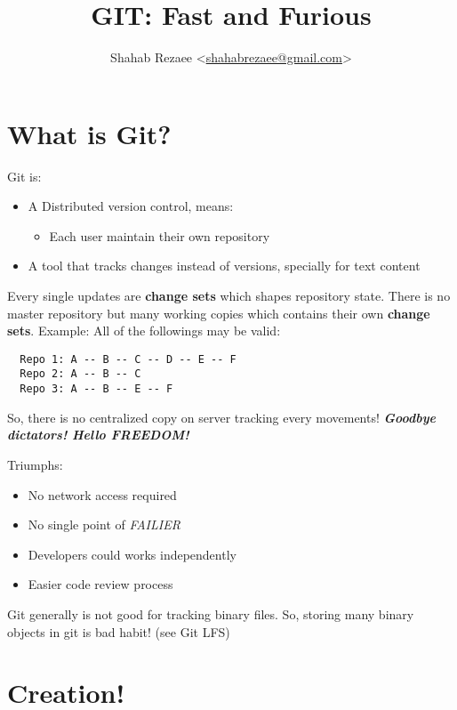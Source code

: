 \documentclass[a4paper,10pt]{article}
\title{GIT: Fast and Furious}
\author{Shahab Rezaee <\href{mailto:shahabrezaee@gmail.com}{shahabrezaee@gmail.com}>}
\date{}
\begin{document}
\maketitle

\section{What is Git?}\label{what-is-git}

Git is:

\begin{itemize}
\itemsep1pt\parskip0pt
\item
  A Distributed version control, means:

  \begin{itemize}
  \itemsep1pt\parskip0pt
  \item
    Each user maintain their own repository
  \end{itemize}
\item
  A tool that tracks changes instead of versions, specially for text
  content
\end{itemize}

Every single updates are \textbf{change sets} which shapes repository
state. There is no master repository but many working copies which
contains their own \textbf{change sets}. Example: All of the followings
may be valid:

\begin{verbatim}
  Repo 1: A -- B -- C -- D -- E -- F
  Repo 2: A -- B -- C
  Repo 3: A -- B -- E -- F
\end{verbatim}

So, there is no centralized copy on server tracking every movements!
\emph{\textbf{Goodbye dictators! Hello FREEDOM!}}

Triumphs:

\begin{itemize}
\itemsep1pt\parskip0pt
\item
  No network access required
\item
  No single point of \emph{FAILIER}
\item
  Developers could works independently
\item
  Easier code review process
\end{itemize}

Git generally is not good for tracking binary files. So, storing many
binary objects in git is bad habit! (see Git LFS)

\section{Creation!}\label{creation}
\end{document}
